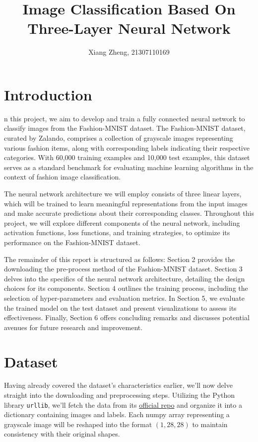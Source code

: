 \documentclass[10pt,a4paper,twoside]{tau}
\title{Image Classification Based On Three-Layer Neural Network}
\author[]{Xiang Zheng, 21307110169}
\affil[]{School of Data Science, Fudan University}
\date{}
\begin{document}
		
\maketitle
\thispagestyle{firststyle}
\tauabstract

\section{Introduction}

n this project, we aim to develop and train a fully connected neural network to classify images from the Fashion-MNIST dataset. The Fashion-MNIST dataset, curated by Zalando, comprises a collection of grayscale images representing various fashion items, along with corresponding labels indicating their respective categories. With 60,000 training examples and 10,000 test examples, this dataset serves as a standard benchmark for evaluating machine learning algorithms in the context of fashion image classification.

The neural network architecture we will employ consists of three linear layers, which will be trained to learn meaningful representations from the input images and make accurate predictions about their corresponding classes. Throughout this project, we will explore different components of the neural network, including activation functions, loss functions, and training strategies, to optimize its performance on the Fashion-MNIST dataset.

The remainder of this report is structured as follows: Section 2 provides the downloading the pre-process method of the Fashion-MNIST dataset. Section 3 delves into the specifics of the neural network architecture, detailing the design choices for its components. Section 4 outlines the training process, including the selection of hyper-parameters and evaluation metrics. In Section 5, we evaluate the trained model on the test dataset and present visualizations to assess its effectiveness. Finally, Section 6 offers concluding remarks and discusses potential avenues for future research and improvement.

\section{Dataset}

Having already covered the dataset's characteristics earlier, we'll now delve straight into the downloading and preprocessing steps. Utilizing the Python library \texttt{urllib}, we'll fetch the data from its \href{https://github.com/zalandoresearch/fashion-mnist}{official repo} and organize it into a dictionary containing images and labels. Each numpy array representing a grayscale image will be reshaped into the format $(1, 28, 28)$ to maintain consistency with their original shapes.
\end{document}
